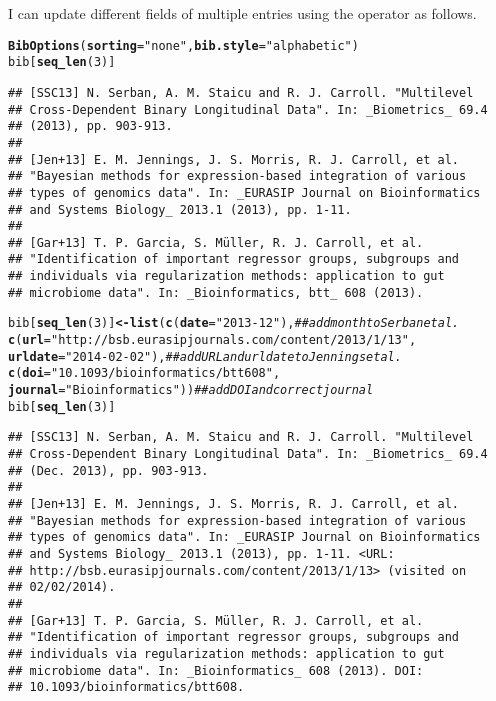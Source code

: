 \documentclass[article]{jss}\usepackage[]{graphicx}\usepackage[]{color}
\makeatletter
\newcommand{\hlnum}[1]{\textcolor[rgb]{0.125,0.125,1}{#1}}%
\newcommand{\hlstr}[1]{\textcolor[rgb]{0.125,0.125,1}{#1}}%
\newcommand{\hlcom}[1]{\textcolor[rgb]{1,0,0.753}{\textit{#1}}}%
\newcommand{\hlstd}[1]{\textcolor[rgb]{0.251,0.251,0.282}{#1}}%
\newcommand{\hlkwb}[1]{\textcolor[rgb]{0.439,0.251,1}{\textbf{#1}}}%
\newcommand{\hlkwc}[1]{\textcolor[rgb]{0.529,0,0.184}{\textbf{#1}}}%
\newcommand{\hlkwd}[1]{\textcolor[rgb]{0.251,0.251,0.282}{\textbf{#1}}}%
\newenvironment{kframe}{%
 \def\at@end@of@kframe{}%
 \ifinner\ifhmode%
  \def\at@end@of@kframe{\end{minipage}}%
  \begin{minipage}{\columnwidth}%
 \fi\fi%
 \def\FrameCommand##1{\hskip\@totalleftmargin \hskip-\fboxsep
 \colorbox{shadecolor}{##1}\hskip-\fboxsep
     \hskip-\linewidth \hskip-\@totalleftmargin \hskip\columnwidth}%
 \MakeFramed {\advance\hsize-\width
   \@totalleftmargin\z@ \linewidth\hsize
   \@setminipage}}%
 {\par\unskip\endMakeFramed%
 \at@end@of@kframe}
\newenvironment{knitrout}{}{} %
\newcommand{\bt}{\`{}}
\makeatother
\begin{document}
I can update different fields of multiple entries using the operator \code{\bt[<-\bt} as follows.
\begin{knitrout}
\color{fgcolor}\begin{kframe}
\begin{alltt}
\hlkwd{BibOptions}\hlstd{(}\hlkwc{sorting} \hlstd{=} \hlstr{"none"}\hlstd{,} \hlkwc{bib.style} \hlstd{=} \hlstr{"alphabetic"}\hlstd{)}
\hlstd{bib[}\hlkwd{seq_len}\hlstd{(}\hlnum{3}\hlstd{)]}
\end{alltt}
\begin{verbatim}
## [SSC13] N. Serban, A. M. Staicu and R. J. Carroll. "Multilevel
## Cross-Dependent Binary Longitudinal Data". In: _Biometrics_ 69.4
## (2013), pp. 903-913.
## 
## [Jen+13] E. M. Jennings, J. S. Morris, R. J. Carroll, et al.
## "Bayesian methods for expression-based integration of various
## types of genomics data". In: _EURASIP Journal on Bioinformatics
## and Systems Biology_ 2013.1 (2013), pp. 1-11.
## 
## [Gar+13] T. P. Garcia, S. Müller, R. J. Carroll, et al.
## "Identification of important regressor groups, subgroups and
## individuals via regularization methods: application to gut
## microbiome data". In: _Bioinformatics, btt_ 608 (2013).
\end{verbatim}
\begin{alltt}
\hlstd{bib[}\hlkwd{seq_len}\hlstd{(}\hlnum{3}\hlstd{)]} \hlkwb{<-} \hlkwd{list}\hlstd{(}\hlkwd{c}\hlstd{(}\hlkwc{date}\hlstd{=}\hlstr{"2013-12"}\hlstd{),} \hlcom{## add month to Serban et al.}
        \hlkwd{c}\hlstd{(}\hlkwc{url}\hlstd{=}\hlstr{"http://bsb.eurasipjournals.com/content/2013/1/13"}\hlstd{,}
          \hlkwc{urldate} \hlstd{=} \hlstr{"2014-02-02"}\hlstd{),} \hlcom{## add URL and urldate to Jennings et al.}
        \hlkwd{c}\hlstd{(}\hlkwc{doi}\hlstd{=}\hlstr{"10.1093/bioinformatics/btt608"}\hlstd{,}
          \hlkwc{journal} \hlstd{=} \hlstr{"Bioinformatics"}\hlstd{))} \hlcom{## add DOI and correct journal}
\hlstd{bib[}\hlkwd{seq_len}\hlstd{(}\hlnum{3}\hlstd{)]}
\end{alltt}
\begin{verbatim}
## [SSC13] N. Serban, A. M. Staicu and R. J. Carroll. "Multilevel
## Cross-Dependent Binary Longitudinal Data". In: _Biometrics_ 69.4
## (Dec. 2013), pp. 903-913.
## 
## [Jen+13] E. M. Jennings, J. S. Morris, R. J. Carroll, et al.
## "Bayesian methods for expression-based integration of various
## types of genomics data". In: _EURASIP Journal on Bioinformatics
## and Systems Biology_ 2013.1 (2013), pp. 1-11. <URL:
## http://bsb.eurasipjournals.com/content/2013/1/13> (visited on
## 02/02/2014).
## 
## [Gar+13] T. P. Garcia, S. Müller, R. J. Carroll, et al.
## "Identification of important regressor groups, subgroups and
## individuals via regularization methods: application to gut
## microbiome data". In: _Bioinformatics_ 608 (2013). DOI:
## 10.1093/bioinformatics/btt608.
\end{verbatim}
\end{kframe}
\end{knitrout}
\end{document}
